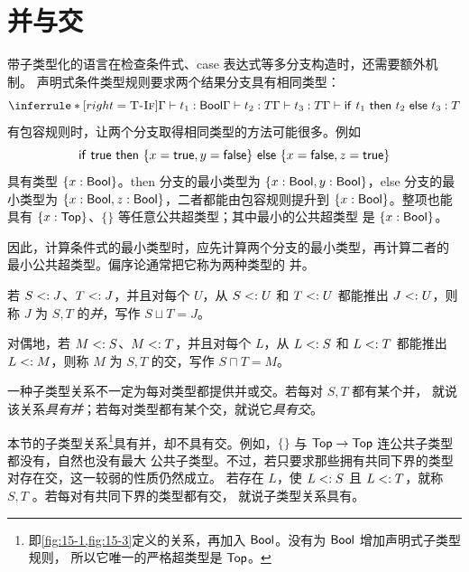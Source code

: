 \section{并与交}
\label{sec:16.3}

带子类型化的语言在检查条件式、case 表达式等多分支构造时，还需要额外机制。
声明式条件类型规则要求两个结果分支具有相同类型：
\[
\inferrule*[right=\textsc{T-If}]
 {\Gamma\vdash t_1:\tapltype{Bool}\\
  \Gamma\vdash t_2:T\\
  \Gamma\vdash t_3:T}
 {\Gamma\vdash
  \mathsf{if}\ t_1\ \mathsf{then}\ t_2\ \mathsf{else}\ t_3:T}
\]
有包容规则时，让两个分支取得相同类型的方法可能很多。例如
\[
\mathsf{if}\ \mathsf{true}\
\mathsf{then}\ \{x=\mathsf{true},y=\mathsf{false}\}\
\mathsf{else}\ \{x=\mathsf{false},z=\mathsf{true}\}
\]
具有类型 \(\{x:\mathsf{Bool}\}\)。then 分支的最小类型为
\(\{x:\mathsf{Bool},y:\mathsf{Bool}\}\)，else 分支的最小类型为
\(\{x:\mathsf{Bool},z:\mathsf{Bool}\}\)，二者都能由包容规则提升到
\(\{x:\mathsf{Bool}\}\)。整项也能具有
\(\{x:\mathsf{Top}\}\)、\(\{\}\) 等任意公共超类型；其中最小的公共超类型
是 \(\{x:\mathsf{Bool}\}\)。

因此，计算条件式的最小类型时，应先计算两个分支的最小类型，再计算二者的
最小公共超类型。偏序论通常把它称为两种类型的
并。

\begin{definition}
\label{def:16.3.1}
若 \(S\mathrel{<:} J\)、\(T\mathrel{<:} J\)，并且对每个 \(U\)，从
\(S\mathrel{<:} U\) 和 \(T\mathrel{<:} U\) 都能推出 \(J\mathrel{<:} U\)，则称
\(J\) 为 \(S,T\) 的\emph{并}，写作 \(S\sqcup T=J\)。

对偶地，若 \(M\mathrel{<:} S\)、\(M\mathrel{<:} T\)，并且对每个 \(L\)，从
\(L\mathrel{<:} S\) 和 \(L\mathrel{<:} T\) 都能推出 \(L\mathrel{<:} M\)，则称
\(M\) 为 \(S,T\) 的交，写作 \(S\sqcap T=M\)。
\end{definition}

一种子类型关系不一定为每对类型都提供并或交。若每对 \(S,T\) 都有某个并，
就说该关系\emph{具有并}；若每对类型都有某个交，就说它\emph{具有交}。

本节的子类型关系\footnote{即\cref{fig:15-1,fig:15-3}定义的关系，再加入
\(\mathsf{Bool}\)。没有为 \(\mathsf{Bool}\) 增加声明式子类型规则，
所以它唯一的严格超类型是 \(\mathsf{Top}\)。}具有并，却不具有交。例如，\(\{\}\) 与
\(\mathsf{Top}\to\mathsf{Top}\) 连公共子类型都没有，自然也没有最大
公共子类型。不过，若只要求那些拥有共同下界的类型对存在交，这一较弱的性质仍然成立。
若存在 \(L\)，使
\(L\mathrel{<:} S\) 且 \(L\mathrel{<:} T\)，就称 \(S,T\)
。若每对有共同下界的类型都有交，
就说子类型关系具有\termfirst{有界交}{bounded meets}。

